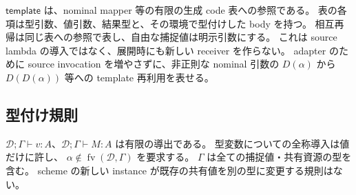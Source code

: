\documentclass[11pt,a4paper]{article}
\newcommand{\fv}{\operatorname{fv}}
\newcommand{\D}{\mathcal D}
\newcommand{\ty}{\mathrel{\vdash}}
\begin{document}
\(\mathsf{template}\) は、nominal mapper 等の有限の生成 code 表への参照である。
表の各項は型引数、値引数、結果型と、その環境で型付けした body を持つ。
相互再帰は同じ表への参照で表し、自由な捕捉値は明示引数にする。
これは source lambda の導入ではなく、展開時にも新しい receiver を作らない。
adapter のために source invocation を増やさずに、非正則な nominal 引数の
\(D(\alpha)\) から \(D(D(\alpha))\) 等への template 再利用を表せる。

\subsection{型付け規則}

\(\D;\Gamma\ty v:A\)、\(\D;\Gamma\ty M:A\) は有限の導出である。
型変数についての全称導入は値だけに許し、
\(\alpha\notin\fv(\D,\Gamma)\) を要求する。
\(\Gamma\) は全ての捕捉値・共有資源の型を含む。
scheme の新しい instance が既存の共有値を別の型に変更する規則はない。
\end{document}
